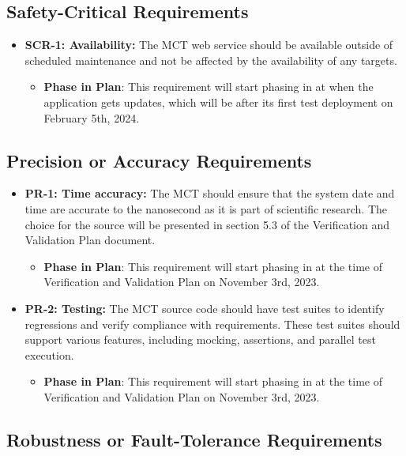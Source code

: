 \documentclass[12pt]{article}
\begin{document}
\subsection{Safety-Critical Requirements}

\begin{itemize}
    \item \textbf{SCR-1: Availability: }The MCT web service should be available outside of scheduled maintenance and not be affected by the availability of any targets.
    \begin{itemize}
        \item \textbf{Phase in Plan}: This requirement will start phasing in at when the application gets updates, which will be after its first test deployment on February 5th, 2024.
    \end{itemize}
\end{itemize}

\subsection{Precision or Accuracy Requirements}

\begin{itemize}
    \item \textbf{PR-1: Time accuracy:} The MCT should ensure that the system date and time are accurate to the nanosecond as it is part of scientific research. The choice for the source will be presented in section 5.3 of the Verification and Validation Plan document.
    \begin{itemize}
        \item \textbf{Phase in Plan}: This requirement will start phasing in at the time of Verification and Validation Plan on November 3rd, 2023.
    \end{itemize}
    \item \textbf{PR-2: Testing: }The MCT source code should have test suites to identify regressions and verify compliance with requirements. These test suites should support various features, including mocking, assertions, and parallel test execution.
    \begin{itemize}
        \item \textbf{Phase in Plan}: This requirement will start phasing in at the time of Verification and Validation Plan on November 3rd, 2023.
    \end{itemize}
\end{itemize}


\subsection{Robustness or Fault-Tolerance Requirements}
\end{document}

